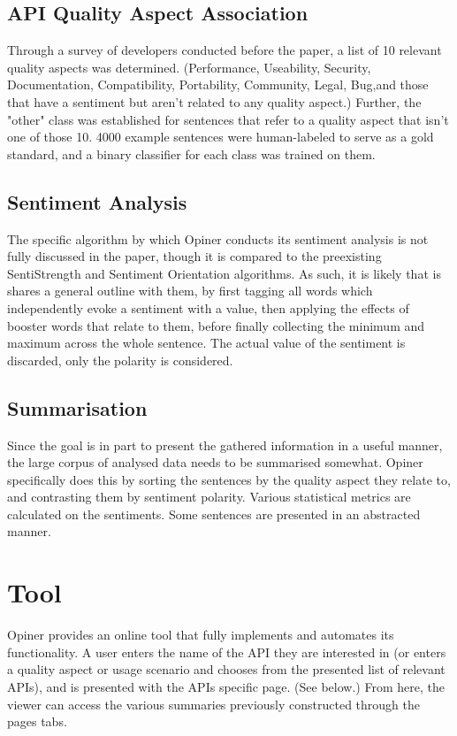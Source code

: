 \documentclass[a4paper,10pt, bibliography=totocnumbered]{scrreprt}
\begin{document}
\subsection{API Quality Aspect Association}

Through a survey of developers conducted before the paper, a list of 10 relevant quality aspects was determined. (Performance, Useability, Security, Documentation, Compatibility, Portability, Community, Legal, Bug,and those that have a sentiment but aren't related to any quality aspect.) Further, the "other" class was established for sentences that refer to a quality aspect that isn't one of those 10. 4000 example sentences were human-labeled to serve as a gold standard, and a binary classifier for each class was trained on them.

\subsection{Sentiment Analysis}

The specific algorithm by which Opiner conducts its sentiment analysis is not fully discussed in the paper, though it is compared to the preexisting SentiStrength and Sentiment Orientation algorithms. As such, it is likely that is shares a general outline with them, by first tagging all words which independently evoke a sentiment with a value, then applying the effects of booster words that relate to them, before finally collecting the minimum and maximum across the whole sentence. The actual value of the sentiment is discarded, only the polarity is considered.

\subsection{Summarisation}

Since the goal is in part to present the gathered information in a useful manner, the large corpus of analysed data needs to be summarised somewhat. Opiner specifically does this by sorting the sentences by the quality aspect they relate to, and contrasting them by sentiment polarity. Various statistical metrics are calculated on the sentiments. Some sentences are presented in an abstracted manner.

\section{Tool}

Opiner provides an online tool that fully implements and automates its functionality. A user enters the name of the API they are interested in (or enters a quality aspect or usage scenario and chooses from the presented list of relevant APIs), and is presented with the APIs specific page. (See below.) From here, the viewer can access the various summaries previously constructed through the pages tabs. 
\end{document}
